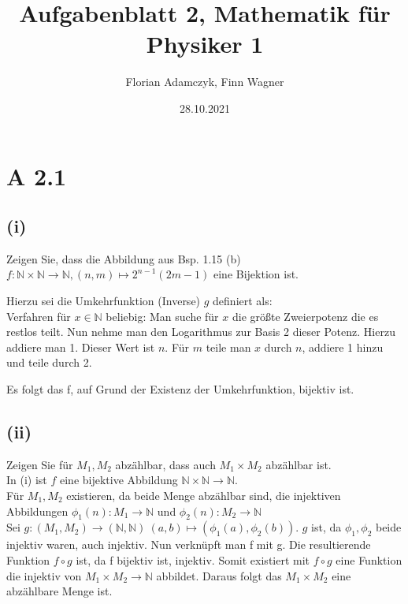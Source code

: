 \documentclass{article}
\date{28.10.2021}
\title{Aufgabenblatt 2, Mathematik für Physiker 1}
\author{Florian Adamczyk, Finn Wagner}
\begin{document}
    \maketitle
    
    \section*{A 2.1}
        \subsection*{(i)}
        \large Zeigen Sie, dass die Abbildung aus Bsp. 1.15 (b)
        \(f : \mathbb{N} \times \mathbb{N} \to \mathbb{N}, (n, m) \mapsto 2^{n-1} (2m -1)\)
        eine Bijektion ist.

        Hierzu sei die Umkehrfunktion (Inverse) \(g\) definiert als: \\
        Verfahren für \(x \in \mathbb{N}\) beliebig: 
        Man suche für \(x\) die größte Zweierpotenz die es restlos teilt. Nun nehme man den Logarithmus zur Basis 2 dieser Potenz.
        Hierzu addiere man 1. Dieser Wert ist \(n\).
        Für \(m\) teile man \(x\) durch \(n\), addiere 1 hinzu und teile durch 2.

        Es folgt das f, auf Grund der Existenz der Umkehrfunktion, bijektiv ist.
        
        \subsection*{(ii)}
            Zeigen Sie für \(M_1, M_2\) abzählbar, dass auch \(M_1 \times M_2\) abzählbar ist. \\
            In (i) ist \(f\) eine bijektive Abbildung \(\mathbb{N} \times \mathbb{N} \to \mathbb{N}\). \\
            Für \(M_1, M_2\) existieren, da beide Menge abzählbar sind, die injektiven Abbildungen \(\phi_1(n): M_1 \to \mathbb{N}\) und \(\phi_2(n): M_2 \to \mathbb{N}\) \\
            Sei \(g: (M_1, M_2) \to (\mathbb{N}, \mathbb{N}) \: (a, b) \mapsto (\phi_1(a), \phi_2(b))\).
            \(g\) ist, da \(\phi_1, \phi_2\) beide injektiv waren, auch injektiv.
            Nun verknüpft man f mit g. Die resultierende Funktion \(f \circ g\) ist, da f bijektiv ist, injektiv.
            Somit existiert mit \(f \circ g\) eine Funktion die injektiv von \(M_1 \times M_2 \to \mathbb{N}\) abbildet.
            Daraus folgt das \(M_1 \times M_2\) eine abzählbare Menge ist.
\end{document}
